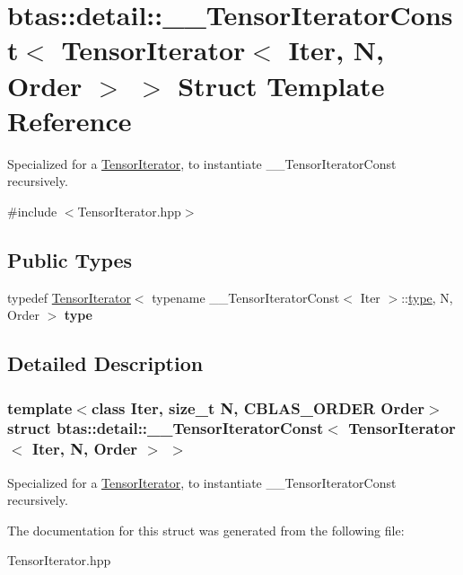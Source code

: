\hypertarget{structbtas_1_1detail_1_1_____tensor_iterator_const_3_01_tensor_iterator_3_01_iter_00_01_n_00_01_order_01_4_01_4}{
\section{btas::detail::\_\-\_\-TensorIteratorConst$<$ TensorIterator$<$ Iter, N, Order $>$ $>$ Struct Template Reference}
\label{structbtas_1_1detail_1_1_____tensor_iterator_const_3_01_tensor_iterator_3_01_iter_00_01_n_00_01_order_01_4_01_4}
}


Specialized for a \hyperlink{classbtas_1_1_tensor_iterator}{TensorIterator}, to instantiate \_\-\_\-TensorIteratorConst recursively.  


{\ttfamily \#include $<$TensorIterator.hpp$>$}\subsection*{Public Types}
\begin{DoxyCompactItemize}
\item 
\hypertarget{structbtas_1_1detail_1_1_____tensor_iterator_const_3_01_tensor_iterator_3_01_iter_00_01_n_00_01_order_01_4_01_4_a629a2db7a34597ee90d36b8661696c72}{
typedef \hyperlink{classbtas_1_1_tensor_iterator}{TensorIterator}$<$ typename \_\-\_\-TensorIteratorConst$<$ Iter $>$::\hyperlink{classbtas_1_1_tensor_iterator}{type}, N, Order $>$ {\bfseries type}}
\label{structbtas_1_1detail_1_1_____tensor_iterator_const_3_01_tensor_iterator_3_01_iter_00_01_n_00_01_order_01_4_01_4_a629a2db7a34597ee90d36b8661696c72}

\end{DoxyCompactItemize}


\subsection{Detailed Description}
\subsubsection*{template$<$class Iter, size\_\-t N, CBLAS\_\-ORDER Order$>$ struct btas::detail::\_\-\_\-TensorIteratorConst$<$ TensorIterator$<$ Iter, N, Order $>$ $>$}

Specialized for a \hyperlink{classbtas_1_1_tensor_iterator}{TensorIterator}, to instantiate \_\-\_\-TensorIteratorConst recursively. 

The documentation for this struct was generated from the following file:\begin{DoxyCompactItemize}
\item 
TensorIterator.hpp\end{DoxyCompactItemize}
